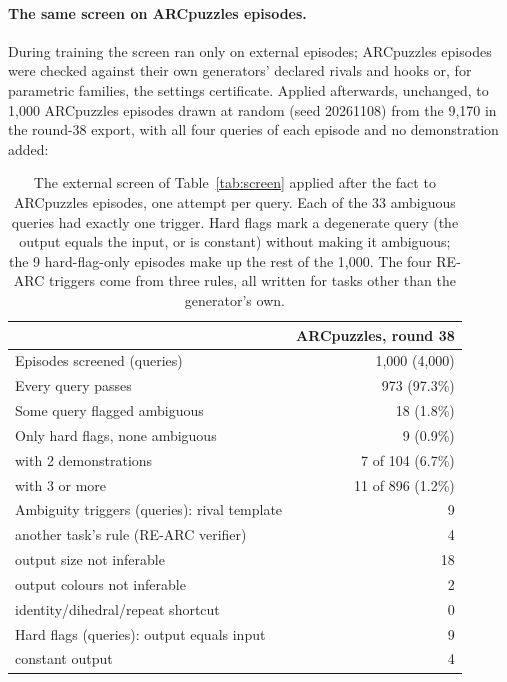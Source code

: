 \documentclass[11pt]{article}
\begin{document}
\paragraph{The same screen on ARCpuzzles episodes.} During training the screen
ran only on external episodes; ARCpuzzles episodes were checked against their own
generators' declared rivals and hooks or, for parametric families, the settings
certificate. Applied afterwards, unchanged, to 1,000
ARCpuzzles episodes drawn at random (seed 20261108) from the 9,170 in the
round-38 export, with all four queries of each episode and no demonstration
added:

\begin{table}[H]
\centering
\small
\begin{tabular}{lr}
\toprule
& ARCpuzzles, round 38 \\
\midrule
Episodes screened (queries) & 1,000 (4,000) \\
Every query passes & 973 (97.3\%) \\
Some query flagged ambiguous & 18 (1.8\%) \\
Only hard flags, none ambiguous & 9 (0.9\%) \\
\quad with 2 demonstrations & 7 of 104 (6.7\%) \\
\quad with 3 or more & 11 of 896 (1.2\%) \\
Ambiguity triggers (queries): rival template & 9 \\
\quad another task's rule (RE-ARC verifier) & 4 \\
\quad output size not inferable & 18 \\
\quad output colours not inferable & 2 \\
\quad identity/dihedral/repeat shortcut & 0 \\
Hard flags (queries): output equals input & 9 \\
\quad constant output & 4 \\
\bottomrule
\end{tabular}
\caption{The external screen of Table~\ref{tab:screen} applied after the fact
to ARCpuzzles episodes, one attempt per query. Each of the 33 ambiguous
queries had exactly one trigger. Hard flags mark a degenerate query (the
output equals the input, or is constant) without making it ambiguous; the 9
hard-flag-only episodes make up the rest of the 1,000. The four RE-ARC
triggers come from three rules, all written for tasks other than the generator's own.}
\label{tab:screen-ours}
\end{table}
\end{document}
